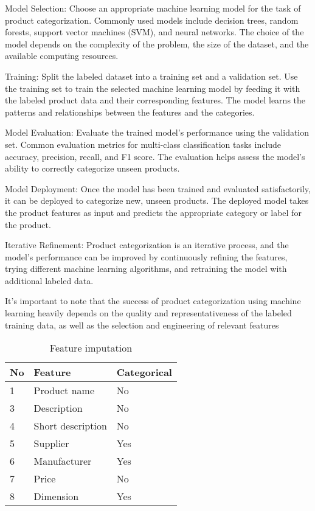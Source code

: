 Model Selection: Choose an appropriate machine learning model for the task of product categorization. Commonly used models include decision trees, random forests, support vector machines (SVM), and neural networks. The choice of the model depends on the complexity of the problem, the size of the dataset, and the available computing resources.

Training: Split the labeled dataset into a training set and a validation set. Use the training set to train the selected machine learning model by feeding it with the labeled product data and their corresponding features. The model learns the patterns and relationships between the features and the categories.

Model Evaluation: Evaluate the trained model's performance using the validation set. Common evaluation metrics for multi-class classification tasks include accuracy, precision, recall, and F1 score. The evaluation helps assess the model's ability to correctly categorize unseen products.

Model Deployment: Once the model has been trained and evaluated satisfactorily, it can be deployed to categorize new, unseen products. The deployed model takes the product features as input and predicts the appropriate category or label for the product.

Iterative Refinement: Product categorization is an iterative process, and the model's performance can be improved by continuously refining the features, trying different machine learning algorithms, and retraining the model with additional labeled data.

It's important to note that the success of product categorization using machine learning heavily depends on the quality and representativeness of the labeled training data, as well as the selection and engineering of relevant features


\begin{table}[h]
    \centering
    \caption{Feature imputation}
    \label{table:feature_imputation}
    \begin{tabular}{ lll }
          \toprule
          
          \textbf{No}& \textbf{Feature} & \textbf{Categorical}\\
          \midrule
          1&Product name & No\\
          3&Description & No\\         
          4&Short description  & No\\
          5&Supplier  & Yes\\
          6&Manufacturer  &  Yes\\           
          7&Price  &  No \\
          8&Dimension  & Yes\\
          \bottomrule
          \end{tabular}
\end{table}


